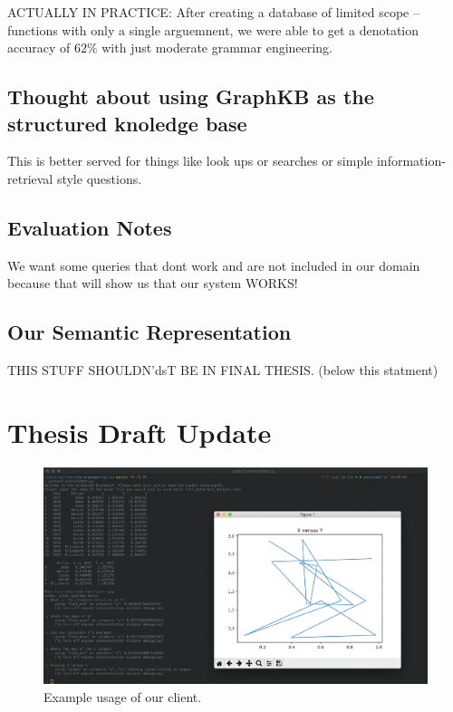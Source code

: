 \documentclass[pageno]{jpaper}
\begin{document}
ACTUALLY IN PRACTICE:
After creating a database of limited scope -- functions with only a single arguemnent, we were able to get a denotation accuracy of $62\%$ with just moderate grammar engineering.


\subsection{Thought about using GraphKB as the structured knoledge base}
This is better served for things like look ups or searches or simple information-retrieval style questions.

\subsection{Evaluation Notes}
We want some queries that dont work and are not included in our domain because that will show us that our system WORKS!  

\subsection{Our Semantic Representation}



THIS STUFF SHOULDN'dsT BE IN FINAL THESIS. (below this statment)

\section{Thesis Draft Update}
\begin{figure}[!hbt]
\centering
\includegraphics[width=1\linewidth]{imgs/screenshot.jpeg}
\caption{Example usage of our client.}
\label{fig:bot}
\end{figure}
\end{document}
